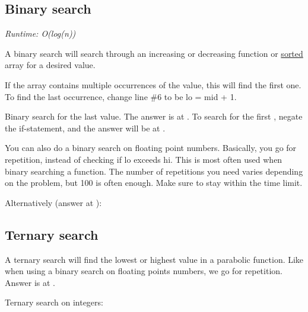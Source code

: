 
\subsection*{Binary search}

\textit{Runtime: O(log(n))}

A binary search will search through an increasing or decreasing function or \underline{sorted} array for a desired value.



If the array contains multiple occurrences of the value, this will find the first one. To find the last occurrence, change line \#6 to be lo = mid + 1.



Binary search for the last  value. The answer is at . To search for the first , negate the if-statement, and the answer will be at . 



You can also do a binary search on floating point numbers. Basically, you go for repetition, instead of checking if lo exceeds hi. This is most often used when binary searching a function. The number of repetitions you need varies depending on the problem, but 100 is often enough. Make sure to stay within the time limit.



Alternatively (answer at ):



\subsection*{Ternary search}

A ternary search will find the lowest or highest value in a parabolic function. Like when using a binary search on floating points numbers, we go for repetition. Answer is at .



Ternary search on integers:



\newpage
